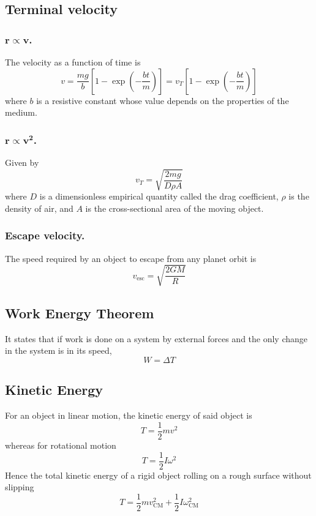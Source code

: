 \documentclass[../../../main.tex]{subfiles}
\begin{document}
\subsection*{Terminal velocity}
\subsubsection*{$\boldsymbol{r\propto v}$.} The velocity as a function of time is 
\begin{equation*}
    v=\frac{mg}{b}\left[1-\exp\left(-\frac{bt}{m}\right)\right]=v_T\left[1-\exp\left(-\frac{bt}{m}\right)\right]
\end{equation*}
where $b$ is a resistive constant whose value depends on the properties of the medium.
\subsubsection*{$\boldsymbol{r\propto v^2}$.} Given by 
\begin{equation*}
    v_T=\sqrt{\frac{2mg}{D\rho A}}
\end{equation*}
where $D$ is a dimensionless empirical quantity called the drag coefficient, $\rho$ is the density of air, and $A$ is the cross-sectional area of the moving object.

\subsubsection*{Escape velocity.} The speed required by an object to escape from any planet orbit is 
\begin{equation*}
    v_\text{esc}=\sqrt{\frac{2GM}{R}}
\end{equation*}

\subsection*{Work Energy Theorem}
It states that if work is done on a system by external forces and
the only change in the system is in its speed,
\begin{equation*}
    W=\Delta T
\end{equation*}

\subsection*{Kinetic Energy}
For an object in linear motion, the kinetic energy of said object is 
\begin{equation*}
    T=\frac{1}{2}mv^2
\end{equation*}
whereas for rotational motion
\begin{equation*}
    T=\frac{1}{2}I\omega^2
\end{equation*}
Hence the total kinetic energy of a rigid object rolling on a rough surface without slipping
\begin{equation*}
    T=\frac{1}{2}mv_\text{CM}^2+\frac{1}{2}I\omega_\text{CM}^2
\end{equation*}
\end{document}
